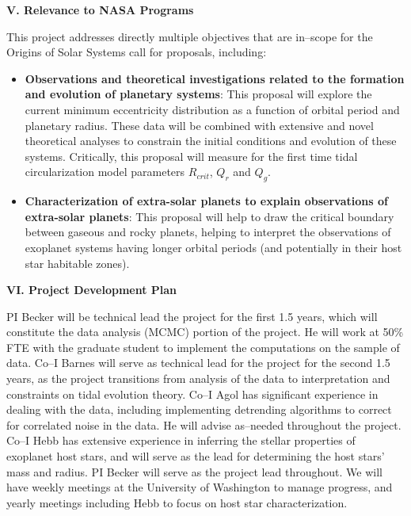 \bigskip
\centerline{\bf V. Relevance to NASA Programs}
\smallskip

This project addresses directly multiple objectives that are in--scope
for the Origins of Solar Systems call for proposals, including:
\begin{itemize}

\item {\bf Observations and theoretical investigations related to the formation 
  and evolution of planetary systems}: This proposal will explore the
  current minimum eccentricity distribution as a function of orbital
  period and planetary radius.  These data will be combined with
  extensive and novel theoretical analyses to constrain the initial
  conditions and evolution of these systems.  Critically, this
  proposal will measure for the first time tidal circularization model
  parameters $R_{crit}$, $Q_{r}$ and $Q_{g}$.

\item {\bf Characterization of extra-solar planets to explain
  observations of extra-solar planets}: This proposal will help to
  draw the critical boundary between gaseous and rocky planets,
  helping to interpret the observations of exoplanet systems having
  longer orbital periods (and potentially in their host star habitable
  zones).

\end{itemize}

\bigskip
\centerline{\bf VI. Project Development Plan}
\smallskip

PI Becker will be technical lead the project for the first 1.5 years,
which will constitute the data analysis (MCMC) portion of the project.
He will work at 50\% FTE with the graduate student to implement the
computations on the \kepler sample of data.  Co--I Barnes will serve
as technical lead for the project for the second 1.5 years, as the
project transitions from analysis of the data to interpretation and
constraints on tidal evolution theory.  Co--I Agol has significant
experience in dealing with the \kepler data, including implementing
detrending algorithms to correct for correlated noise in the \kepler
data.  He will advise as--needed throughout the project.  Co--I Hebb
has extensive experience in inferring the stellar properties of
exoplanet host stars, and will serve as the lead for determining the
host stars' mass and radius.  PI Becker will serve as the project lead
throughout.  We will have weekly meetings at the University of
Washington to manage progress, and yearly meetings including Hebb to
focus on host star characterization.

